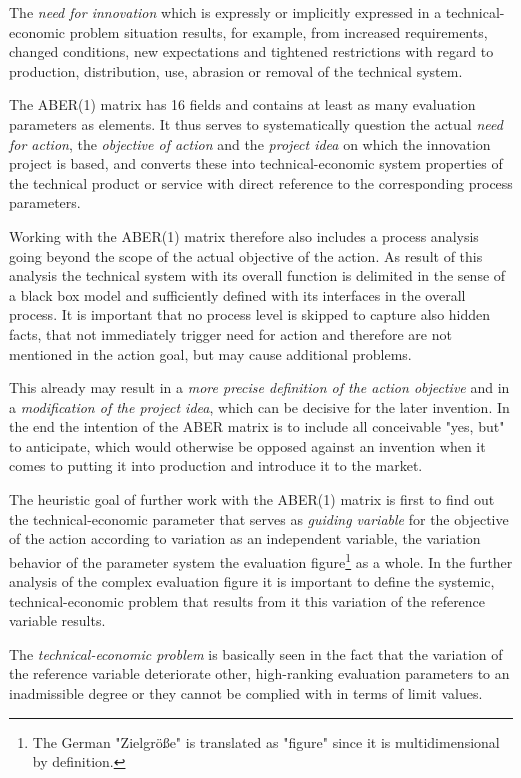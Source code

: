 \documentclass[11pt,a4paper]{article}
\begin{document}
The \emph{need for innovation} which is expressly or implicitly expressed in a
technical-economic problem situation results, for example, from increased
requirements, changed conditions, new expectations and tightened restrictions
with regard to production, distribution, use, abrasion or removal of the
technical system.

The ABER(1) matrix has 16 fields and contains at least as many evaluation
parameters as elements. It thus serves to systematically question the actual
\emph{need for action}, the \emph{objective of action} and the \emph{project
  idea} on which the innovation project is based, and converts these into
technical-economic system properties of the technical product or service with
direct reference to the corresponding process parameters.

Working with the ABER(1) matrix therefore also includes a process analysis
going beyond the scope of the actual objective of the action. As result of
this analysis the technical system with its overall function is delimited in
the sense of a black box model and sufficiently defined with its interfaces in
the overall process. It is important that no process level is skipped to
capture also hidden facts, that not immediately trigger need for action and
therefore are not mentioned in the action goal, but may cause additional
problems.

This already may result in a \emph{more precise definition of the action
  objective} and in a \emph{modification of the project idea}, which can be
decisive for the later invention. In the end the intention of the ABER matrix
is to include all conceivable "yes, but" to anticipate, which would otherwise
be opposed against an invention when it comes to putting it into production
and introduce it to the market.

The heuristic goal of further work with the ABER(1) matrix is first to find
out the technical-economic parameter that serves as \emph{guiding variable}
for the objective of the action according to variation as an independent
variable, the variation behavior of the parameter system the evaluation
figure\footnote{The German "Zielgröße" is translated as "figure" since it is
  multidimensional by definition.} as a whole. In the further analysis of the
complex evaluation figure it is important to define the systemic,
technical-economic problem that results from it this variation of the
reference variable results.

The \emph{technical-economic problem} is basically seen in the fact that the
variation of the reference variable deteriorate other, high-ranking evaluation
parameters to an inadmissible degree or they cannot be complied with in terms
of limit values.
\end{document}
